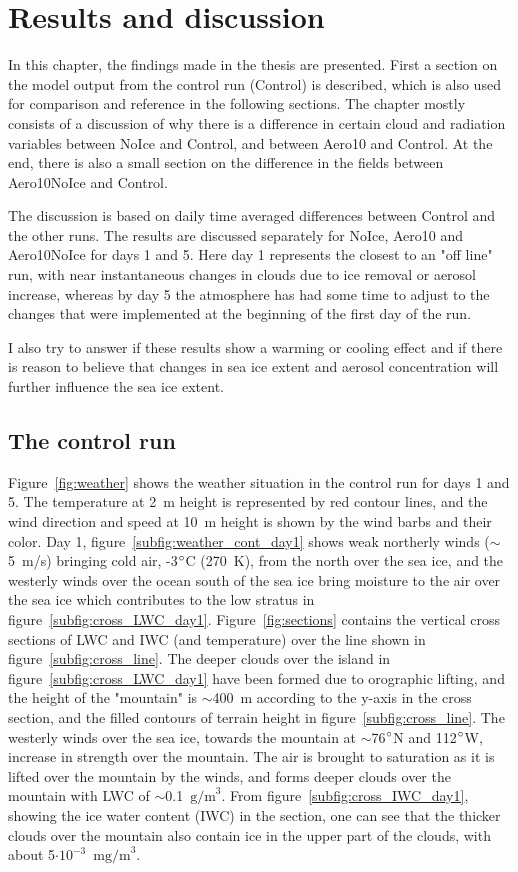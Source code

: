 \chapter{Results and discussion}
\label{chap:results}
In this chapter, the findings made in the thesis are presented. First a section on the model output from the control run (Control) is described, which is also used for comparison and reference in the following sections. The chapter mostly consists of a discussion of why there is a difference in certain cloud and radiation variables between NoIce and Control, and between Aero10 and Control. At the end, there is also a small section on the difference in the fields between Aero10NoIce and Control.

The discussion is based on daily time averaged differences between Control and the other runs. The results are discussed separately for NoIce, Aero10 and Aero10NoIce for days 1 and 5. Here day 1 represents the closest to an "off line" run, with near instantaneous changes in clouds due to ice removal or aerosol increase, whereas by day 5 the atmosphere has had some time to adjust to the changes that were implemented at the beginning of the first day of the run.

I also try to answer if these results show a warming or cooling effect and if there is reason to believe that changes in sea ice extent and aerosol concentration will further influence the sea ice extent.

\section{The control run}
Figure~\ref{fig:weather} shows the weather situation in the control run for days 1 and 5. The temperature at 2~m height is represented by red contour lines, and the wind direction and speed at 10~m height is shown by the 
wind barbs and their color. Day 1, figure~\ref{subfig:weather_cont_day1} shows weak northerly winds ($\sim$ 5~m/s) bringing cold air, -3$\degree$C (270~K), from the north over the sea ice, and the westerly winds over the ocean south of the sea ice bring moisture to the air over the sea ice which contributes to the low stratus in figure~\ref{subfig:cross_LWC_day1}. Figure~\ref{fig:sections} contains the vertical cross sections of LWC and IWC (and temperature) over the line shown in figure~\ref{subfig:cross_line}. The deeper clouds over the island in figure~\ref{subfig:cross_LWC_day1} have been formed due to orographic lifting, and the height of the "mountain" is $\sim$400~m according to the y-axis in the cross section, and the filled contours of terrain height in figure~\ref{subfig:cross_line}. The westerly winds over the sea ice, towards the mountain at $\sim$76$\degree$N and 112$\degree$W, increase in strength over the mountain. The air is brought to saturation as it is lifted over the mountain by the winds, and forms deeper clouds over the mountain with LWC of $\sim$0.1~$\text{g/m}^3$. From figure~\ref{subfig:cross_IWC_day1}, showing the ice water content (IWC) in the section, one can see that the thicker clouds over the mountain also contain ice in the upper part of the clouds, with about 5$\cdot\text{10}^{-3}$~$\text{mg/m}^3$. 

